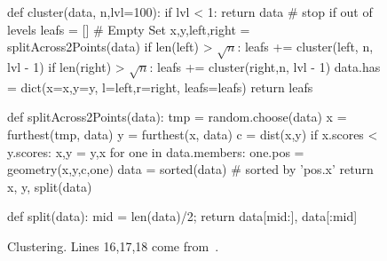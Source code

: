 \begin{figure} 
\begin{python}[left]
def cluster(data, n,lvl=100):
  if lvl < 1: 
     return data # stop if out of levels
  leafs = [] # Empty Set
  x,y,left,right = splitAcross2Points(data) 
  if len(left) > $\sqrt{n}$:  
     leafs += cluster(left, n, lvl - 1)  
  if len(right) > $\sqrt{n}$:  
     leafs += cluster(right,n,  lvl - 1) 
  data.has = dict(x=x,y=y,
                 l=left,r=right,
                 leafs=leafs)
  return leafs
  
def splitAcross2Points(data): 
  tmp = random.choose(data)
  x = furthest(tmp, data)
  y = furthest(x, data) 
  c = dist(x,y)  
  if x.scores < y.scores:
     x,y = y,x 
  for one in data.members: 
    one.pos = geometry(x,y,c,one)
  data = sorted(data) # sorted by 'pos.x'
  return x, y, split(data)
  
def split(data):   
  mid = len(data)/2; 
  return data[mid:], data[:mid]
\end{python}
\caption{Clustering. Lines 16,17,18 come from~\cite{fastmap}. }\label{fig:fastmapCode}   
\end{figure}
